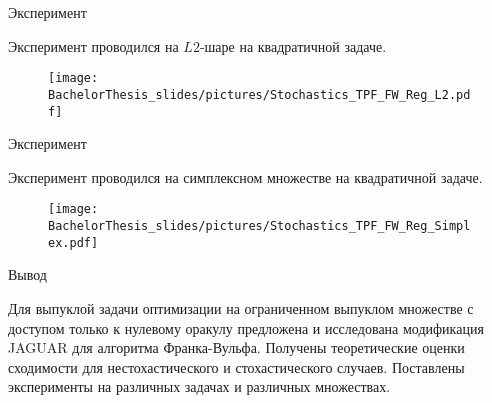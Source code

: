 \documentclass{beamer}
\begin{document}

\begin{frame}{Эксперимент}

    Эксперимент проводился на $L2$-шаре на квадратичной задаче.

    \begin{figure}
        \centering
        \texttt{[image: BachelorThesis\_slides/pictures/Stochastics\_TPF\_FW\_Reg\_L2.pdf]}
    \end{figure}

\end{frame}


\begin{frame}{Эксперимент}

    Эксперимент проводился на симплексном множестве на квадратичной задаче.

    \begin{figure}
        \centering
        \texttt{[image: BachelorThesis\_slides/pictures/Stochastics\_TPF\_FW\_Reg\_Simplex.pdf]}
    \end{figure}

\end{frame}


\begin{frame}{Вывод}

    Для выпуклой задачи оптимизации на ограниченном выпуклом множестве с доступом только к нулевому оракулу предложена и исследована модификация JAGUAR для алгоритма Франка-Вульфа. Получены теоретические оценки сходимости для нестохастического и стохастического случаев. Поставлены эксперименты на различных задачах и различных множествах.
    
\end{frame}



\end{document}
